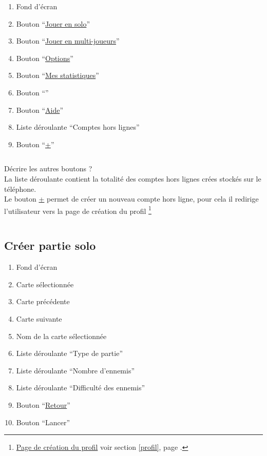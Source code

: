 \documentclass{report}
\begin{document}
		\begin{enumerate}
		  \item Fond d'écran
		  \item Bouton ``\hyperlink{Creer partie solo}{Jouer en solo}''
		  \item Bouton ``\hyperlink{Connexion multi-joueurs}{Jouer en multi-joueurs}''
		  \item Bouton ``\hyperlink{Options}{Options}''
		  \item Bouton ``\hyperlink{Statistiques}{Mes statistiques}''
		  \item Bouton ``''
		  \item Bouton ``\hyperlink{Aide}{Aide}''
		  \item Liste déroulante ``Comptes hors lignes''
		  \item Bouton ``\hyperlink{Création du profil}{+}'' 
		\end{enumerate}
		
		$\,$
		
		Décrire les autres boutons ? \\		
		La liste déroulante contient la totalité des comptes hors lignes crées stockés
		sur le téléphone. \\
		Le bouton \hyperlink{Création du profil}{+} permet de créer un nouveau compte
		hors ligne, pour cela il redirige l'utilisateur vers la page de création du profil%
		\footnote[1]{
			\hyperlink{Création du profil}{Page de création du profil}
			\og voir section \ref{profil}, page \pageref{profil}.\fg
		}
		
		$\,$
	
\newpage

	\subsection{Créer partie solo}
	
		\hypertarget{Creer partie solo}{}
		\label{Creer partie solo}
	
		
		
		\begin{enumerate}
		  \item Fond d'écran
		  \item Carte sélectionnée
		  \item Carte précédente
		  \item Carte suivante
		  \item Nom de la carte sélectionnée
		  \item Liste déroulante ``Type de partie''
		  \item Liste déroulante ``Nombre d'ennemis''
		  \item Liste déroulante ``Difficulté des ennemis''
		  \item Bouton ``\hyperlink{Page d'accueil}{Retour}''
		  \item Bouton ``Lancer'' 
		\end{enumerate}
		
\end{document}
